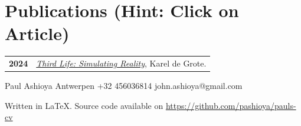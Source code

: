 \documentclass{modernsimplecv}
\newlength{\rightcolwidth}
\begin{document}
\begin{paracol}{2}
\begin{skillsection}{\rightcolwidth}
\end{skillsection}

\bigskip



\vspace{4em}


\begin{minipage}[t]{\rightcolwidth}
\section*{Publications (Hint: Click on Article)}
\begin{tabular}{>{\footnotesize\bfseries}r >{\footnotesize}p{}}
2024 & \emph{\href{https://medium.com/@john.ashioya/third-life-simulating-reality-14d7663896dd}{Third Life: Simulating Reality}}, Karel de Grote. \\
\end{tabular}
\bigskip
\end{minipage}
\end{paracol}

\vfill{} %
\setlength{\parindent}{0pt}
\begin{minipage}[t]{\textwidth}
\begin{center}\fontfamily{\sfdefault}\selectfont \color{black!70}
{\small Paul Ashioya  Antwerpen  +32 456036814 
 {john.ashioya@gmail.com}
}
\end{center} 
\begin{center}  \color{gray}
    {
        Written in LaTeX. Source code available on \protect\url{https://github.com/pashioya/pauls-cv}
    }
\end{center}
\end{minipage}
\end{document}
